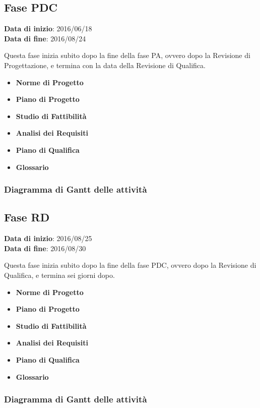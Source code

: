 	\subsection{Fase PDC}
	\begin{center}
		\textbf{Data di inizio}: 2016/06/18 \\
		\textbf{Data di fine}: 2016/08/24 \\
	\end{center}
	Questa fase inizia subito dopo la fine della fase PA, ovvero dopo la Revisione di Progettazione, e termina con la data della Revisione di Qualifica.
		\begin{itemize}
			\item \textbf{Norme di Progetto}
			\item \textbf{Piano di Progetto}
			\item \textbf{Studio di Fattibilità}
			\item \textbf{Analisi dei Requisiti}
			\item \textbf{Piano di Qualifica}
			\item \textbf{Glossario}
		\end{itemize}
		\subsubsection{Diagramma di Gantt delle attività}
		
	\subsection{Fase RD}
	\begin{center}
		\textbf{Data di inizio}: 2016/08/25 \\
		\textbf{Data di fine}: 2016/08/30 \\
	\end{center}
	Questa fase inizia subito dopo la fine della fase PDC, ovvero dopo la Revisione di Qualifica, e termina sei giorni dopo.
		\begin{itemize}
			\item \textbf{Norme di Progetto}
			\item \textbf{Piano di Progetto}
			\item \textbf{Studio di Fattibilità}
			\item \textbf{Analisi dei Requisiti}
			\item \textbf{Piano di Qualifica}
			\item \textbf{Glossario}
		\end{itemize}
		\subsubsection{Diagramma di Gantt delle attività}
		
